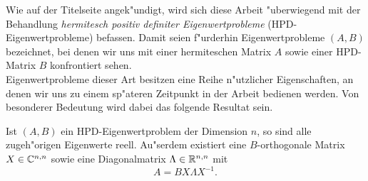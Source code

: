 Wie auf der Titelseite angek"undigt, wird sich diese Arbeit "uberwiegend mit der Behandlung \emph{hermitesch positiv definiter Eigenwertprobleme} (HPD-Eigenwertprobleme) befassen.
Damit seien f"urderhin Eigenwertprobleme $(A,B)$ bezeichnet, bei denen wir uns mit einer hermiteschen Matrix $A$ sowie einer HPD-Matrix $B$ konfrontiert sehen.\\

Eigenwertprobleme dieser Art besitzen eine Reihe n"utzlicher Eigenschaften, an denen wir uns zu einem sp"ateren Zeitpunkt in der Arbeit bedienen werden.
Von besonderer Bedeutung wird dabei das folgende Resultat sein.

\begin{thm}\label{thm:chap1:realEigenvalues}
Ist $(A,B)$ ein HPD-Eigenwertproblem der Dimension $n$, so sind alle zugeh"origen Eigenwerte reell.
Au"serdem existiert eine $B$-orthogonale Matrix $X\in\mathbb{C}^{n,n}$ sowie eine Diagonalmatrix $\Lambda\in\mathbb{R}^{n,n}$ mit
\begin{equation}\label{eq:chap1:evpMatrix}
A = BX\Lambda X^{-1}.
\end{equation}
\end{thm}

